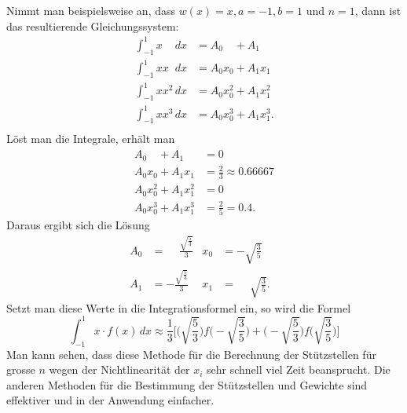 Nimmt man beispielsweise an, dass $w(x) = x, a = -1, b = 1$ und $n = 1$, 
dann ist das resultierende Gleichungssystem:
\begin{align}
    \int_{-1}^{1} x \phantom{x^{0}} \, dx &= A_{0}\phantom{x^{0}} + A_{1}\phantom{x^{0}} \\
    \int_{-1}^{1} x x^{\phantom{2}} \, dx &= A_{0}x_{0} + A_{1}x_{1} \\
    \int_{-1}^{1} x x^{2} \, dx &= A_{0}x_{0}^{2} + A_{1}x_{1}^{2} \\
    \int_{-1}^{1} x x^{3} \, dx &= A_{0}x_{0}^{3} + A_{1}x_{1}^{3}. \\
\end{align}
Löst man die Integrale, erhält man
\begin{align}
    A_{0}\phantom{x^{0}} + A_{1}\phantom{x^{0}} &= 0 \\
    A_{0}x_{0} + A_{1}x_{1} &= \frac{2}{3} \approx 0.66667 \\
    A_{0}x_{0}^{2} + A_{1}x_{1}^{2} &= 0 \\
    A_{0}x_{0}^{3} + A_{1}x_{1}^{3} &= \frac{2}{5} = 0.4.
\end{align}
Daraus ergibt sich die Lösung
\begin{align}
    A_{0} &= \phantom{-}\frac{\sqrt{\frac{5}{3}}}{3} & x_{0} &= -\sqrt{\frac{3}{5}} & \\
    A_{1} &= -\frac{\sqrt{\frac{5}{3}}}{3} & x_{1} &= \phantom{-}\sqrt{\frac{3}{5}}. &
\end{align}
Setzt man diese Werte in die Integrationsformel ein, so wird die Formel
\begin{equation}
    \int_{-1}^{1}x \cdot f(x)\,dx 
    \approx 
    \frac{1}{3} 
    \bigg[ 
        \biggl(\sqrt{\frac{5}{3}}\biggr)
        f\biggl(-\sqrt{\frac{3}{5}}\biggr) 
        + 
        \biggl(-\sqrt{\frac{5}{3}}\biggr)
        f\biggl(\sqrt{\frac{3}{5}}\biggr)
    \bigg]
\end{equation}
Man kann sehen, dass diese Methode für die Berechnung der Stützstellen 
für grosse $n$ wegen der Nichtlinearität der $x_{i}$ sehr schnell viel Zeit beansprucht.
Die anderen Methoden für die Bestimmung der Stützstellen 
und Gewichte sind effektiver und in der Anwendung einfacher.

